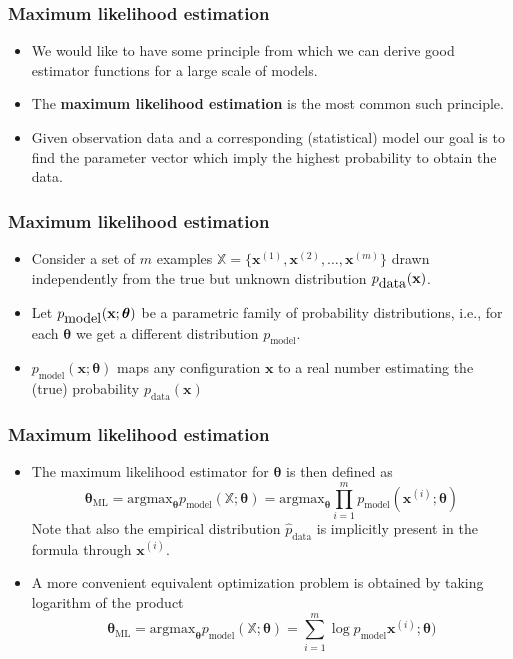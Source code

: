 \documentclass[notes]{beamer}          %
\newcommand{\vect}[1]{\bm{#1}}
\newcommand{\field}[1]{\mathbb{#1}}
\begin{document}
\begin{frame}
\frametitle{Maximum likelihood estimation}
    \begin{itemize}
        \item We would like to have some principle from which we can derive good estimator functions for a large scale of models.
        \item The {\bf maximum likelihood estimation} is the most common such principle.
        \item Given observation data and a corresponding (statistical) model our goal is to find the parameter vector which imply the highest probability to obtain the data.
    \end{itemize}
\end{frame}


\begin{frame}
\frametitle{Maximum likelihood estimation}
    \begin{itemize}
        \item Consider a set of $m$ examples $\field{X} = \{ \vect{x}^{(1)}, \vect{x}^{(2)}, \ldots,  \vect{x}^{(m)} \}$ drawn independently from the true but unknown distribution $p_{\mbox{data}}(\text{\bf x})$.
        \item Let $p_{\mbox{model}}(\text{\bf x};\vect{\theta})$ be a parametric family of probability distributions, i.e., for each $\vect{\theta}$ we get a different distribution  $p_{\mbox{model}}$.
        \item $p_{\mbox{model}}(\vect{x};\vect{\theta})$ maps any configuration $\vect{x}$ to a real number estimating the (true) probability $p_{\mbox{data}}(\vect{x})$
    \end{itemize}
\end{frame}


\begin{frame}
\frametitle{Maximum likelihood estimation}
    \begin{itemize}
        \item The maximum likelihood estimator for $\vect{\theta}$ is then defined as
        $$
        \vect{\theta}_{\mbox{ML}} = \mbox{argmax}_{\vect{\theta}} p_{\mbox{model}}(\field{X};\vect{\theta}) =  \mbox{argmax}_{\vect{\theta}} \prod_{i = 1}^{m} p_{\mbox{model}}(\vect{x}^{(i)};\vect{\theta})
        $$
        Note that also the empirical distribution $\hat{p}_{\mbox{data}}$ is implicitly present in the formula through $\vect{x}^{(i)}$.
        \item A more convenient equivalent optimization problem is obtained by taking logarithm of the product
        $$
        \vect{\theta}_{\mbox{ML}} = \mbox{argmax}_{\vect{\theta}} p_{\mbox{model}}(\field{X};\vect{\theta}) = \sum_{i=1}^{m} \log p_{\mbox{model}}\vect{x}^{(i)};\vect{\theta})
        $$
    \end{itemize}
\end{frame}
\end{document}
